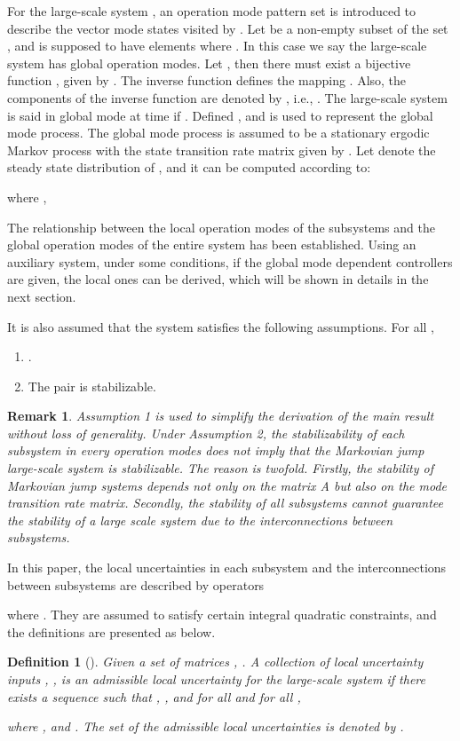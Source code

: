 \documentclass[11pt,draftcls,onecolumn]{IEEEtran}
\newtheorem{definition}{Definition}
\newtheorem{remark}{Remark}
\begin{document}
For the large-scale system ,  an operation mode pattern set  is introduced to describe the vector mode states visited by . Let  be a non-empty subset of the set , and is supposed to have  elements where . In this case we say the large-scale system has  global operation modes. Let , then there must exist a bijective function , given by . The inverse function   defines the mapping . Also, the components of the inverse function  are denoted by  , i.e., .  The large-scale system is said in global mode  at time  if . Defined , and  is used to represent the global mode process. The global mode process is assumed to be a stationary ergodic Markov process with the state transition rate matrix given by . Let  denote the steady state distribution of , and it can be computed according to:

where , 

The relationship between the local operation modes of the subsystems and the global operation modes of the entire system has been established.  Using an auxiliary system, under some conditions, if the  global mode dependent controllers are given, the local ones can be derived, which will be shown in details in the next section.

It is also assumed that the system  satisfies the following assumptions. For all ,
\begin{enumerate}
\item .
\item The pair  is  stabilizable.
\end{enumerate}
\begin{remark}
Assumption 1 is used to simplify the
derivation of the main result without loss of generality. Under  Assumption 2,  the stabilizability of each subsystem in every operation modes does not imply
that the Markovian jump large-scale system is stabilizable. The reason is twofold. Firstly, the
stability of Markovian jump systems depends not only on the matrix A but also on the mode
transition rate matrix. Secondly, the stability of all subsystems cannot guarantee the stability
of a large scale system due to the interconnections between subsystems.
\end{remark}


In this paper, the local uncertainties in each subsystem and the interconnections between subsystems
 are described by operators


where . They
 are assumed to satisfy certain integral quadratic constraints, and the definitions are presented as below.
\begin{definition}[\cite{Xiong2009}] Given a set of matrices , . A
  collection of local uncertainty inputs , , is an
  admissible local uncertainty for the large-scale system if there exists a
  sequence  such that , ,
  and for all  and for all ,
\label{definition for local uncertainties}

  where , and . The set of the admissible local uncertainties is denoted by .
\end{definition}
\end{document}
